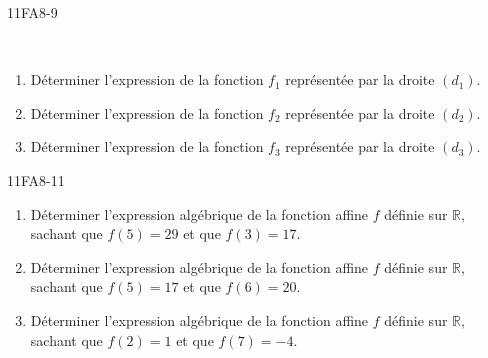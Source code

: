 \documentclass[a4paper,12pt]{report}
\begin{document}
\begin{EXO}{}{11FA8-9}
\begin{tikzpicture}[baseline,scale = 0.75]
\end{tikzpicture}\\
\begin{enumerate}[]
	\item Déterminer l'expression de la fonction $f_1$ représentée par la droite $(d_1)$.
	\item Déterminer l'expression de la fonction $f_2$ représentée par la droite $(d_2)$.
	\item Déterminer l'expression de la fonction $f_3$ représentée par la droite $(d_3)$.
\end{enumerate}
\end{EXO}

\begin{EXO}{}{11FA8-11}


\begin{enumerate}[]
	\item  Déterminer l'expression algébrique de la fonction affine $f$ définie sur $\mathbb R$, sachant que
                        $f(5)=29$ et que $f(3)=17$.\\
	\item  Déterminer l'expression algébrique de la fonction affine $f$ définie sur $\mathbb R$, sachant que
                        $f(5)=17$ et que $f(6)=20$.\\
	\item  Déterminer l'expression algébrique de la fonction affine $f$ définie sur $\mathbb R$, sachant que
                        $f(2)=1$ et que $f(7)=-4$.\\
\end{enumerate}
\end{EXO}
\end{document}
